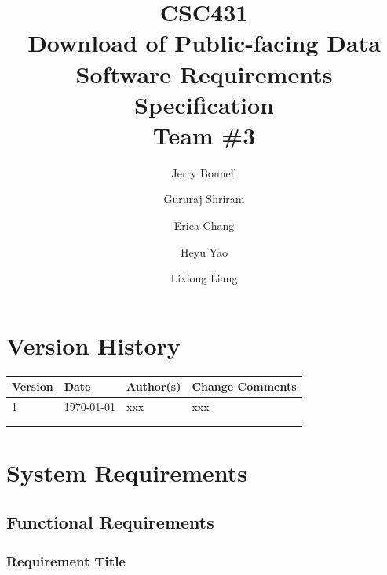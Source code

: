 \documentclass{article}
\begin{document}
\title{
    CSC431 \\
    \vspace{0.2in}
    \textbf{Download of Public-facing Data} \\
    \large Software Requirements Specification \\
    Team \#3 
}

\author{
    Jerry Bonnell
    \and Gururaj Shriram 
    \and Erica Chang
    \and Heyu Yao
    \and Lixiong Liang
}

\date{}
\maketitle

\clearpage
\section*{Version History}

\begin{tabularx}{\textwidth}{| l | l | X | X |}
    \hline
    \textbf{Version} & \textbf{Date} & \textbf{Author(s)} & \textbf{Change Comments} \\
    \hline
         1   & \today   &    xxx       &      xxx   \\
    \hline 
            &      &           &                 \\
    \hline
            &      &           &                 \\
    \hline             
\end{tabularx}

\clearpage
	\tableofcontents

\clearpage
	\listoffigures
	\listoftables

\clearpage

\section{System Requirements}

\subsection{Functional Requirements}

\subsubsection{Requirement Title}
\end{document}
